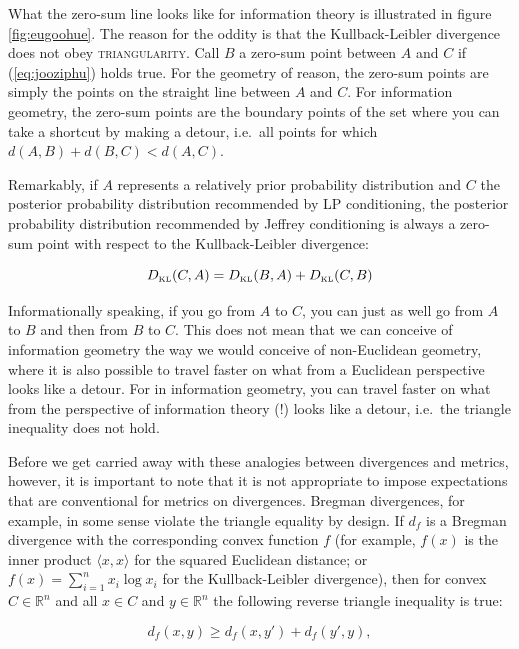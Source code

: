 \documentclass[12pt]{article}
\begin{document}
What the zero-sum line looks like for information theory is
illustrated in figure \ref{fig:eugoohue}. The reason for the oddity is
that the Kullback-Leibler divergence does not obey
\textsc{triangularity}. Call $B$ a zero-sum point between $A$ and $C$
if (\ref{eq:jooziphu}) holds true. For the geometry of reason, the
zero-sum points are simply the points on the straight line between $A$
and $C$. For information geometry, the zero-sum points are the
boundary points of the set where you can take a shortcut by making a
detour, i.e.\ all points for which $d(A,B)+d(B,C)<d(A,C)$.

Remarkably, if $A$ represents a relatively prior probability
distribution and $C$ the posterior probability distribution
recommended by LP conditioning, the posterior probability distribution
recommended by Jeffrey conditioning is always a zero-sum point with
respect to the Kullback-Leibler divergence:

\begin{equation}
  \label{eq:ocidocho}
  D_{\mbox{\tiny KL}}(C,A)=D_{\mbox{\tiny KL}}(B,A)+D_{\mbox{\tiny KL}}(C,B)
\end{equation}

Informationally speaking, if you go from $A$ to $C$, you can just as
well go from $A$ to $B$ and then from $B$ to $C$. This does not mean
that we can conceive of information geometry the way we would conceive
of non-Euclidean geometry, where it is also possible to travel faster
on what from a Euclidean perspective looks like a detour. For in
information geometry, you can travel faster on what from the
perspective of information theory (!) looks like a detour, i.e.\ the
triangle inequality does not hold. 

Before we get carried away with these analogies between divergences
and metrics, however, it is important to note that it is not
appropriate to impose expectations that are conventional for metrics
on divergences. Bregman divergences, for example, in some sense
violate the triangle equality by design. If $d_{f}$ is a Bregman
divergence with the corresponding convex function $f$ (for example,
$f(x)$ is the inner product $\langle{}x,x\rangle$ for the squared
Euclidean distance; or $f(x)=\sum_{i=1}^{n}{}x_{i}\log{}x_{i}$ for the
Kullback-Leibler divergence), then for convex $C\in\mathbb{R}^{n}$ and
all $x\in{}C$ and $y\in\mathbb{R}^{n}$ the following reverse triangle
inequality is true: 

\begin{equation}
\label{eq:aiphaiho}
d_{f}(x,y)\geq{}d_{f}(x,y')+d_{f}(y',y), 
\end{equation}
\end{document}
